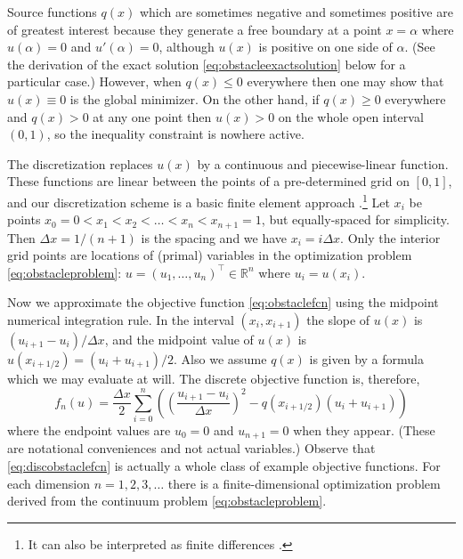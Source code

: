 \documentclass[11pt]{article}
\newcommand{\RR}{\mathbb{R}}
\begin{document}
Source functions $q(x)$ which are sometimes negative and sometimes positive are of greatest interest because they generate a free boundary at a point $x=\alpha$ where $u(\alpha)=0$ and $u'(\alpha)=0$, although $u(x)$ is positive on one side of $\alpha$.  (See the derivation of the exact solution \eqref{eq:obstacleexactsolution} below for a particular case.)  However, when $q(x)\le 0$ everywhere then one may show that $u(x)\equiv 0$ is the global minimizer.  On the other hand, if $q(x)\ge 0$ everywhere and $q(x) > 0$ at any one point then $u(x)>0$ on the whole open interval $(0,1)$, so the inequality constraint is nowhere active.

The discretization replaces $u(x)$ by a continuous and piecewise-linear function.  These functions are linear between the points of a pre-determined grid on $[0,1]$, and our discretization scheme is a basic finite element approach \cite{Elmanetal2014}.\footnote{It can also be interpreted as finite differences \cite{LeVeque2007}.}  Let $x_i$ be points $x_0 = 0 < x_1 < x_2 < \dots < x_n < x_{n+1}=1$, but equally-spaced for simplicity.  Then $\Delta x = 1 / (n+1)$ is the spacing and we have $x_i = i\Delta x$.  Only the interior grid points are locations of (primal) variables in the optimization problem \eqref{eq:obstacleproblem}: $u = (u_1,\dots,u_n)^\top \in \RR^n$ where $u_i=u(x_i)$.

Now we approximate the objective function \eqref{eq:obstaclefcn} using the midpoint numerical integration rule.  In the interval $(x_i,x_{i+1})$ the slope of $u(x)$ is $(u_{i+1}-u_i)/\Delta x$, and the midpoint value of $u(x)$ is $u(x_{i+1/2}) = (u_i + u_{i+1})/2$.  Also we assume $q(x)$ is given by a formula which we may evaluate at will.  The discrete objective function is, therefore,
\begin{equation}
    f_n(u) = \frac{\Delta x}{2} \sum_{i=0}^n \left(\left(\frac{u_{i+1}-u_i}{\Delta x}\right)^2 - q(x_{i+1/2}) (u_i + u_{i+1})\right) \label{eq:discobstaclefcn}
\end{equation}
where the endpoint values are $u_0=0$ and $u_{n+1}=0$ when they appear.  (These are notational conveniences and not actual variables.)  Observe that \eqref{eq:discobstaclefcn} is actually a whole class of example objective functions.  For each dimension $n=1,2,3,\dots$ there is a finite-dimensional optimization problem derived from the continuum problem \eqref{eq:obstacleproblem}.
\end{document}
